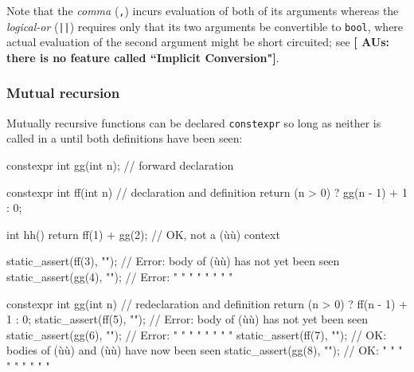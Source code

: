 \noindent Note that the \emph{comma} (\lstinline!,!) 
incurs evaluation of both of its arguments whereas the \emph{logical-or}
(\lstinline!||!)  requires only that its two arguments be
convertible to \lstinline!bool!, where actual evaluation of the second
argument might be short circuited; see \featureref{}{}\textbf{[ AUs: there is no feature called ``Implicit Conversion"]}.

\subsubsection[Mutual recursion]{Mutual recursion}\label{mutual-recursion}

Mutually recursive functions can be declared \lstinline!constexpr! so long
as neither is called in a  until both
definitions have been seen:

\begin{emcppslisting}
constexpr int gg(int n);       // forward declaration

constexpr int ff(int n)        // declaration and definition
{
    return (n > 0) ? gg(n - 1) + 1 : 0;
}

int hh()
{
    return ff(1) + gg(2);  // OK, not a (ù{}ù) context
}

static_assert(ff(3), "");      // Error: body of (ù{}ù) has not yet been seen
static_assert(gg(4), "");      // Error:  "   "   "    "   "   "   "    "

constexpr int gg(int n)        // redeclaration and definition
{
    return (n > 0) ? ff(n - 1) + 1 : 0;
    static_assert(ff(5), "");  // Error: body of (ù{}ù) has not yet been seen
    static_assert(gg(6), "");  // Error:  "   "   "    "   "   "   "    "
}
static_assert(ff(7), "");      // OK: bodies of (ù{}ù) and (ù{}ù) have now been seen
static_assert(gg(8), "");      // OK:    "   "   "    "   "    "    "   "    "
\end{emcppslisting}


